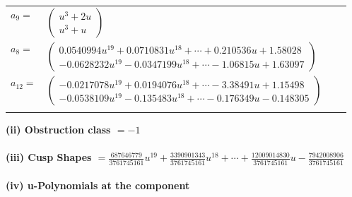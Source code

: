 \documentclass[1p]{elsarticle_modified}
\theoremstyle{definition}
\begin{document}
\begin{tabular}{m{7pt} m{180pt} m{7pt} m{180pt} }
\flushright $a_{9}=$&$\begin{pmatrix}u^3+2 u\\u^3+u\end{pmatrix}$ \\
\flushright $a_{8}=$&$\begin{pmatrix}0.0540994 u^{19}+0.0710831 u^{18}+\cdots+0.210536 u+1.58028\\-0.0628232 u^{19}-0.0347199 u^{18}+\cdots-1.06815 u+1.63097\end{pmatrix}$ \\
\flushright $a_{12}=$&$\begin{pmatrix}-0.0217078 u^{19}+0.0194076 u^{18}+\cdots-3.38491 u+1.15498\\-0.0538109 u^{19}-0.135483 u^{18}+\cdots-0.176349 u-0.148305\end{pmatrix}$\\&\end{tabular}
\flushleft \textbf{(ii) Obstruction class $= -1$}\\~\\
\flushleft \textbf{(iii) Cusp Shapes $= \frac{687646779}{3761745161} u^{19}+\frac{3390901343}{3761745161} u^{18}+\cdots+\frac{12009014830}{3761745161} u-\frac{7942008906}{3761745161}$}\\~\\
\newpage\renewcommand{\arraystretch}{1}
\flushleft \textbf{(iv) u-Polynomials at the component}\newline \\
\end{document}
